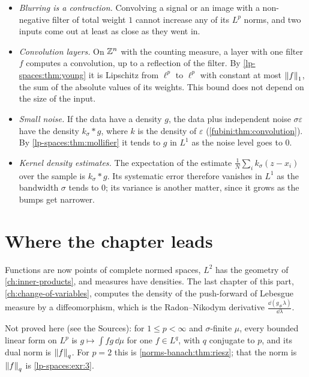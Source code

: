 \begin{notechapter}
\begin{mlthread}
\begin{itemize}[nosep]
  \item \emph{Blurring is a contraction.} Convolving a signal or an
        image with a non-negative filter of total weight $1$ cannot
        increase any of its $L^p$ norms, and two inputs come out at
        least as close as they went in.
  \item \emph{Convolution layers.} On $\mathbb{Z}^n$ with the counting measure,
        a layer with one filter $f$ computes a convolution, up to a
        reflection of the filter. By \cref{lp-spaces:thm:young} it is
        Lipschitz from $\ell^p$ to $\ell^p$ with constant at most
        $\left\|f\right\|_1$, the sum of the absolute values of its weights.
        This bound does not depend on the size of the input.
  \item \emph{Small noise.} If the data have a density $g$, the data
        plus independent noise $\sigma\varepsilon$ have the density
        $k_\sigma*g$, where $k$ is the density of $\varepsilon$
        (\cref{fubini:thm:convolution}). By
        \cref{lp-spaces:thm:mollifier} it tends to $g$ in $L^1$ as
        the noise level goes to $0$.
  \item \emph{Kernel density estimates.} The expectation of the
        estimate $\frac1N\sum_ik_\sigma(z - x_i)$ over the sample is
        $k_\sigma*g$. Its systematic error therefore vanishes in $L^1$
        as the bandwidth $\sigma$ tends to $0$; its variance is another
        matter, since it grows as the bumps get narrower.
\end{itemize}
\end{mlthread}

\section{Where the chapter leads}\label{lp-spaces:sec:outlook}

Functions are now points of complete normed spaces, $L^2$ has the
geometry of \cref{ch:inner-products}, and measures have densities. The
last chapter of this part, \cref{ch:change-of-variables}, computes the
density of the push-forward of Lebesgue measure by a diffeomorphism,
which is the Radon--Nikodym derivative
$\frac{\dd(g_\#\lambda)}{\dd\lambda}$.

Not proved here (see the Sources): for $1\leq p < \infty$ and
$\sigma$-finite $\mu$,
every bounded linear form on $L^p$ is $g\mapsto\int fg\,\dd\mu$ for one
$f\in L^q$, with $q$ conjugate to $p$, and its dual norm is
$\left\|f\right\|_q$. For $p = 2$ this is \cref{norms-banach:thm:riesz}; that
the norm is $\left\|f\right\|_q$ is \cref{lp-spaces:exr:3}.


\end{notechapter}
